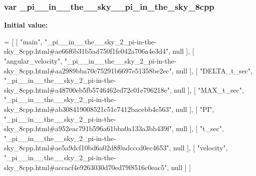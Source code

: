 \subsubsection[{\texorpdfstring{\+\_\+pi\+\_\+\+\_\+in\+\_\+\+\_\+the\+\_\+\+\_\+sky\+\_\+2\+\_\+pi\+\_\+in\+\_\+the\+\_\+sky\+\_\+8cpp}{_pi__in__the__sky_2_pi_in_the_sky_8cpp}}]{\setlength{\rightskip}{0pt plus 5cm}var \+\_\+pi\+\_\+\+\_\+in\+\_\+\+\_\+the\+\_\+\+\_\+sky\+\_\+\_\+pi\+\_\+in\+\_\+the\+\_\+sky\+\_\+8cpp}\hypertarget{__pi____in____the____sky__2__pi-in-the-sky__8cpp_8js_a5be10b6a3da49fbd822befca4be63079}{}\label{__pi____in____the____sky__2__pi-in-the-sky__8cpp_8js_a5be10b6a3da49fbd822befca4be63079}
{\bfseries Initial value\+:}
\begin{DoxyCode}
=
[
    [ \textcolor{stringliteral}{"main"}, \textcolor{stringliteral}{"\_pi\_\_in\_\_the\_\_sky\_2\_pi-in-the-sky\_8cpp.html#ae66f6b31b5ad750f1fe042a706a4e3d4"}, null ],
    [ \textcolor{stringliteral}{"angular\_velocity"}, \textcolor{stringliteral}{"\_pi\_\_in\_\_the\_\_sky\_2\_pi-in-the-sky\_8cpp.html#aa2989bba70c75291b6697e51358be2ec"}, 
      null ],
    [ \textcolor{stringliteral}{"DELTA\_t\_sec"}, \textcolor{stringliteral}{"\_pi\_\_in\_\_the\_\_sky\_2\_pi-in-the-sky\_8cpp.html#a48700eb5fb5746462cd72c01e796218e"}, null 
      ],
    [ \textcolor{stringliteral}{"MAX\_t\_sec"}, \textcolor{stringliteral}{"\_pi\_\_in\_\_the\_\_sky\_2\_pi-in-the-sky\_8cpp.html#ab308419008521c51c7412bacebb4c563"}, null ],
    [ \textcolor{stringliteral}{"PI"}, \textcolor{stringliteral}{"\_pi\_\_in\_\_the\_\_sky\_2\_pi-in-the-sky\_8cpp.html#a952eac791b596a61bba0a133a3bb439f"}, null ],
    [ \textcolor{stringliteral}{"t\_sec"}, \textcolor{stringliteral}{"\_pi\_\_in\_\_the\_\_sky\_2\_pi-in-the-sky\_8cpp.html#ae5a9dcf10bd6a02d8f0adcccd0ec4653"}, null ],
    [ \textcolor{stringliteral}{"velocity"}, \textcolor{stringliteral}{"\_pi\_\_in\_\_the\_\_sky\_2\_pi-in-the-sky\_8cpp.html#accacf4e9263030d70ed79f8516c0eac5"}, null ]
]
\end{DoxyCode}
